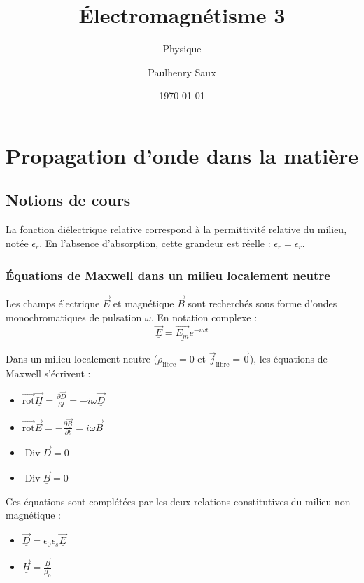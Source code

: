 \documentclass[french]{yLectureNote}
\title{Électromagnétisme 3}
\subtitle{Physique}
\author{Paulhenry Saux}
\date{\today}
\renewcommand{\vec}{\overrightarrow}
\DeclareMathOperator{\Div}{Div}
\newcommand{\rot}{\vec{\mathrm{rot}}}
\begin{document}
\chapter{Propagation d'onde dans la matière}

\section{Notions de cours}

\begin{definition}
La fonction diélectrique relative correspond à la permittivité relative du milieu, notée $\underline{\epsilon_r}$. En l'absence d'absorption, cette grandeur est réelle : $\underline{\epsilon_r} = \epsilon_r$.
\end{definition}


\subsection{Équations de Maxwell dans un milieu localement neutre}

Les champs électrique $\vec{E}$ et magnétique $\vec{B}$ sont recherchés sous forme d'ondes monochromatiques de pulsation $\omega$. En notation complexe :
$$\underline{\vec{E}} = \underline{\vec{E_m}} e^{-i\omega t}$$

Dans un milieu localement neutre ($\rho_{\text{libre}} = 0$ et $\vec{j}_{\text{libre}} = \vec{0}$), les équations de Maxwell s'écrivent :
\begin{itemize}
    \item $\rot \underline{\vec{H}} = \frac{\partial \underline{\vec{D}}}{\partial t} = -i\omega \underline{\vec{D}}$
    \item $\rot \underline{\vec{E}} = -\frac{\partial \underline{\vec{B}}}{\partial t} = i\omega \underline{\vec{B}}$
    \item $\Div \underline{\vec{D}} = 0$
    \item $\Div \underline{\vec{B}} = 0$
\end{itemize}

Ces équations sont complétées par les deux relations constitutives du milieu non magnétique :
\begin{itemize}
    \item $\underline{\vec{D}} = \epsilon_0 \epsilon_s \underline{\vec{E}}$
    \item $\underline{\vec{H}} = \frac{\underline{\vec{B}}}{\mu_0}$
\end{itemize}
\end{document}
